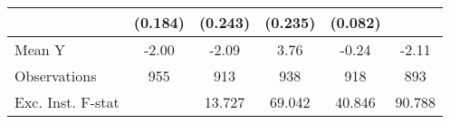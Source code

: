 {\begin{tabular}{l*{5}{c}}
            &     (0.184)         &     (0.243)         &     (0.235)         &     (0.082)         &                     \\
\midrule
Mean Y      &       -2.00         &       -2.09         &        3.76         &       -0.24         &       -2.11         \\
Observations&         955         &         913         &         938         &         918         &         893         \\
Exc. Inst. F-stat&                     &      13.727         &      69.042         &      40.846         &      90.788         \\
\bottomrule
\end{tabular}
}
